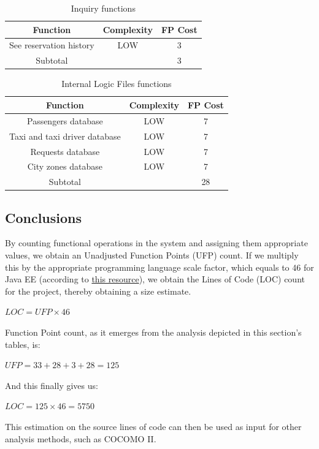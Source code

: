 
\begin{table}
\begin{center}
\begin{tabular}{ccc}
\toprule
Function                        & Complexity   & FP Cost \\
\midrule
See reservation history         &   LOW   &   3   \\
\midrule
Subtotal                        &         &   3   \\
\bottomrule
\end{tabular}
\caption{Inquiry functions}
\end{center}
\end{table}


\begin{table}
\begin{center}
\begin{tabular}{ccc}
\toprule
Function                           & Complexity   & FP Cost \\
\midrule
Passengers database               &   LOW   &   7   \\
Taxi and taxi driver database      &   LOW   &   7   \\
Requests database                  &   LOW   &   7   \\
City zones database               &   LOW   &   7   \\
\midrule
Subtotal                           &          &   28   \\
\bottomrule 
\end{tabular}
\caption{Internal Logic Files functions}
\end{center}
\end{table}

\subsection{Conclusions}
 By counting functional operations in the system and assigning them appropriate values, we obtain an Unadjusted Function Points (UFP) count. If we multiply this by the appropriate programming language scale factor, which equals to 46 for Java EE (according to \href{http://www.qsm.com/resources/function-point-languages-table}{this resource}), we obtain the Lines of Code (LOC) count for the project, thereby obtaining a size estimate.
\begin{center}
$ LOC = UFP \times 46 $
\end{center}
Function Point count, as it emerges from the analysis depicted in this section's tables, is:
\begin{center}
$ UFP = 33 + 28 + 3 + 28 = 125 $
\end{center}
And this finally gives us:
\begin{center}
$ LOC = 125 \times 46 = 5750$
\end{center}
This estimation on the source lines of code can then be used as input for other analysis methods, such as COCOMO II.

